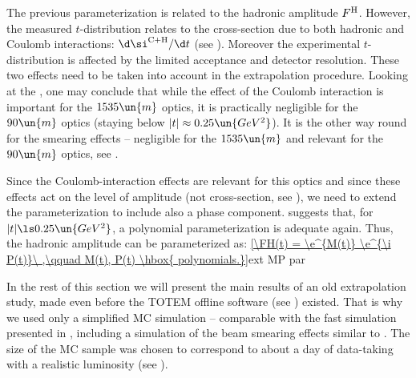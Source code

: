 
The previous parameterization is related to the hadronic amplitude $F^{\rm H}$. However, the measured $t$-distribution relates to the cross-section due to both hadronic and Coulomb interactions: $\d\si^{\rm C+H}/\d t$ (see ). Moreover the experimental $t$-distribution is affected by the limited acceptance and detector resolution. These two effects need to be taken into account in the extrapolation procedure. Looking at the , one may conclude that while the effect of the Coulomb interaction is important for the $1535\un{m}$ optics, it is practically negligible for the $90\un{m}$ optics (staying below $|t| \approx 0.25\un{GeV^2}$). It is the other way round for the smearing effects -- negligible for the $1535\un{m}$ and relevant for the $90\un{m}$ optics, see .

\bmfig
{}
\emfig

\def\OutlineLabel{Extrapolation for beta* = 1535 m optics}

Since the Coulomb-interaction effects are relevant for this optics and since these effects act on the level of amplitude (not cross-section, see ), we need to extend the parameterization  to include also a phase component.  suggests that, for $|t| \ls 0.25\un{GeV^2}$, a polynomial parameterization is adequate again. Thus, the hadronic amplitude can be parameterized as:
\eqref{\FH(t) = \e^{M(t)} \e^{\i P(t)}\ ,\qquad M(t), P(t) \hbox{ polynomials.}}{ext MP par}

In the rest of this section we will present the main results of an old extrapolation study, made even before the TOTEM offline software (see ) existed. That is why we used only a simplified MC simulation -- comparable with the fast simulation presented in , including a simulation of the beam smearing effects similar to . The size of the MC sample was chosen to correspond to about a day of data-taking with a realistic luminosity (see ).

